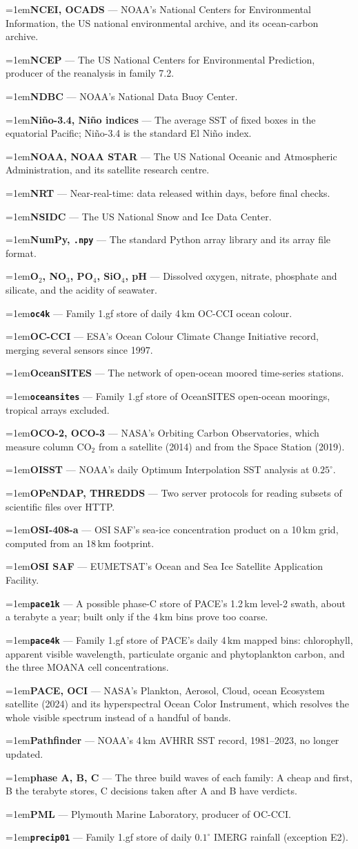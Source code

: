 \documentclass[10pt]{article}
\newcommand{\code}[1]{\texttt{#1}}
\newcommand{\gl}[2]{\par\hangindent=1em\hangafter=1\textbf{#1} --- #2\par}
\begin{document}
\gl{NCEI, OCADS}{NOAA's National Centers for Environmental Information, the US national environmental archive, and its ocean-carbon archive.}
\gl{NCEP}{The US National Centers for Environmental Prediction, producer of the reanalysis in family 7.2.}
\gl{NDBC}{NOAA's National Data Buoy Center.}
\gl{Ni\~no-3.4, Ni\~no indices}{The average SST of fixed boxes in the equatorial Pacific; Ni\~no-3.4 is the standard El Ni\~no index.}
\gl{NOAA, NOAA STAR}{The US National Oceanic and Atmospheric Administration, and its satellite research centre.}
\gl{NRT}{Near-real-time: data released within days, before final checks.}
\gl{NSIDC}{The US National Snow and Ice Data Center.}
\gl{NumPy, \code{.npy}}{The standard Python array library and its array file format.}
\gl{O$_2$, NO$_3$, PO$_4$, SiO$_4$, pH}{Dissolved oxygen, nitrate, phosphate and silicate, and the acidity of seawater.}
\gl{\code{oc4k}}{Family 1.gf store of daily 4\,km OC-CCI ocean colour.}
\gl{OC-CCI}{ESA's Ocean Colour Climate Change Initiative record, merging several sensors since 1997.}
\gl{OceanSITES}{The network of open-ocean moored time-series stations.}
\gl{\code{oceansites}}{Family 1.gf store of OceanSITES open-ocean moorings, tropical arrays excluded.}
\gl{OCO-2, OCO-3}{NASA's Orbiting Carbon Observatories, which measure column CO$_2$ from a satellite (2014) and from the Space Station (2019).}
\gl{OISST}{NOAA's daily Optimum Interpolation SST analysis at $0.25^\circ$.}
\gl{OPeNDAP, THREDDS}{Two server protocols for reading subsets of scientific files over HTTP.}
\gl{OSI-408-a}{OSI SAF's sea-ice concentration product on a 10\,km grid, computed from an 18\,km footprint.}
\gl{OSI SAF}{EUMETSAT's Ocean and Sea Ice Satellite Application Facility.}
\gl{\code{pace1k}}{A possible phase-C store of PACE's 1.2\,km level-2 swath, about a terabyte a year; built only if the 4\,km bins prove too coarse.}
\gl{\code{pace4k}}{Family 1.gf store of PACE's daily 4\,km mapped bins: chlorophyll, apparent visible wavelength, particulate organic and phytoplankton carbon, and the three MOANA cell concentrations.}
\gl{PACE, OCI}{NASA's Plankton, Aerosol, Cloud, ocean Ecosystem satellite (2024) and its hyperspectral Ocean Color Instrument, which resolves the whole visible spectrum instead of a handful of bands.}
\gl{Pathfinder}{NOAA's 4\,km AVHRR SST record, 1981--2023, no longer updated.}
\gl{phase A, B, C}{The three build waves of each family: A cheap and first, B the terabyte stores, C decisions taken after A and B have verdicts.}
\gl{PML}{Plymouth Marine Laboratory, producer of OC-CCI.}
\gl{\code{precip01}}{Family 1.gf store of daily $0.1^\circ$ IMERG rainfall (exception E2).}
\end{document}
